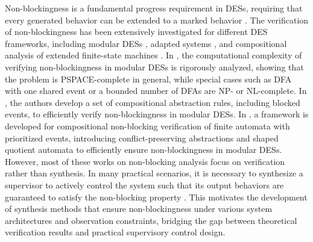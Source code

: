 \documentclass[journal,twoside,web]{ieeecolor}
\begin{document}
Non-blockingness is a fundamental progress requirement in DESs, requiring that every generated behavior can be extended to a marked behavior \cite{chen1991dealing}.
%
The verification of non-blockingness has been extensively investigated for different DES frameworks, including modular DESs \cite{tang2024compositional}, adapted systems \cite{thuijsman2024transformational}, and compositional analysis of extended finite-state machines \cite{mohajerani2016framework}.
%
In \cite{tomas2018complexity}, the computational complexity of verifying non-blockingness in modular DESs is rigorously analyzed, showing that the problem is PSPACE-complete in general, while special cases such as DFA with one shared event or a bounded number of DFAs are NP- or NL-complete.
%
In \cite{pilbrow2015algorithm}, the authors develop a set of compositional abstraction rules, including blocked events, to efficiently verify non-blockingness in modular DESs.
%
In \cite{tang2024compositional}, a framework is developed for compositional non-blocking verification of finite automata with prioritized events, introducing conflict-preserving abstractions and shaped quotient automata to efficiently ensure non-blockingness in modular DESs.
%
However, most of these works on non-blocking analysis focus on verification rather than synthesis. In many practical scenarios, it is necessary to synthesize a supervisor to actively control the system such that its output behaviors are guaranteed to satisfy the non-blocking property \cite{chen1991dealing, malik2013compositional}. 
This motivates the development of synthesis methods that ensure non-blockingness under various system architectures and observation constraints, bridging the gap between theoretical verification results and practical supervisory control design.
\end{document}
